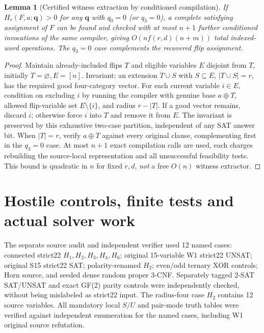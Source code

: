 \documentclass[11pt]{article}
\newtheorem{lemma}{Lemma}
\newcommand{\vv}[1]{\boldsymbol{#1}}
\begin{document}
\begin{lemma}[Certified witness extraction by conditioned compilation]\label{lem:wit}
If $H_r(F,a;\vv q)>0$ for any $\vv q$ with $q_0=0$ (or $q_3=0$), a complete satisfying assignment of $F$ can be found and checked with at most $n+1$ further conditioned invocations of the same compiler, giving $O(n f(r,d)(n+m))$ total indexed-word operations. The $q_3=0$ case complements the recovered flip assignment.
\end{lemma}
\begin{proof}
Maintain already-included flips $T$ and eligible variables $E$ disjoint from $T$, initially $T=\varnothing,E=[n]$. Invariant: an extension $T\cup S$ with $S\subseteq E$, $|T\cup S|=r$, has the required good four-category vector. For each current variable $i\in E$, condition on excluding $i$ by running the compiler with genuine base $a\oplus T$, allowed flip-variable set $E\setminus\{i\}$, and radius $r-|T|$. If a good vector remains, discard $i$; otherwise force $i$ into $T$ and remove it from $E$. The invariant is preserved by this exhaustive two-case partition, independent of any SAT answer bit. When $|T|=r$, verify $a\oplus T$ against every original clause, complementing first in the $q_3=0$ case. At most $n+1$ exact compilation calls are used, each charges rebuilding the source-local representation and all unsuccessful feasibility tests. This bound is quadratic in $n$ for fixed $r,d$, \emph{not} a free $O(n)$ witness extractor.
\end{proof}

\section{Hostile controls, finite tests and actual solver work}
The separate source audit and independent verifier used 12 named cases: connected strict22 $H_1,H_2,H_3,H_4,H_6$; original 15-variable W1 strict22 UNSAT; original S15 strict22 SAT; polarity-renamed $H_2$; even/odd ternary XOR controls; Horn source, and seeded dense random proper 3-CNF. Separately tagged 2-SAT SAT/UNSAT and exact GF(2) parity controls were independently checked, without being mislabeled as strict22 input. The radius-four case $H_2$ contains 12 source variables. All mandatory local $S/U$ and pair-mode truth tables were verified against independent enumeration for the named cases, including W1 original source refutation.
\end{document}
